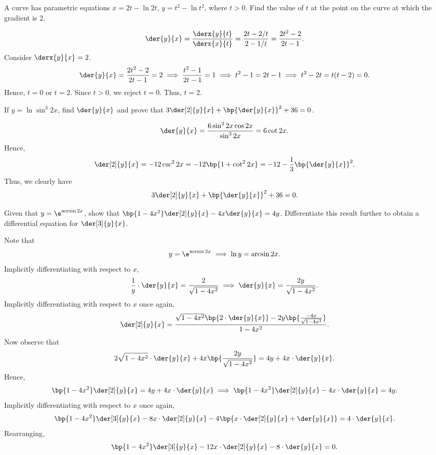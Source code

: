 \begin{problem}
    A curve has parametric equations $x = 2t-\ln{2t}, \, y = t^2 - \ln t^2$, where $t > 0$. Find the value of $t$ at the point on the curve at which the gradient is 2.
\end{problem}
\begin{solution}
    \[\der{y}{x} = \frac{\derx{y}{t}}{\derx{x}{t}} = \frac{2t - 2/t}{2 - 1/t} = \frac{2t^2 - 2}{2t - 1}.\] Consider $\derx{y}{x} = 2$. \[\der{y}{x} = \frac{2t^2 - 2}{2t - 1} = 2 \implies \frac{t^2 - 1}{2t - 1} = 1 \implies t^2 - 1 = 2t - 1 \implies t^2 - 2t = t(t - 2) = 0.\] Hence, $t = 0$ or $t = 2$. Since $t > 0$, we reject $t = 0$. Thus, $t = 2$.
\end{solution}

\clearpage
\begin{problem}
    If $y = \ln{\sin^3 2x}$, find $\der{y}{x}$ and prove that $3\der[2]{y}{x} + \bp{\der{y}{x}}^2 + 36 = 0$.
\end{problem}
\begin{solution}
    \[\der{y}{x} = \frac{6\sin^2 2x \cos 2x}{\sin^3 2x} = 6\cot 2x.\] Hence, \[\der[2]{y}{x} = -12\csc^2 2x = -12 \bp{1 + \cot^2 2x} = -12 - \frac13 \bp{\der{y}{x}}^2.\] Thus, we clearly have \[3\der[2]{y}{x} + \bp{\der{y}{x}}^2 + 36 = 0.\]
\end{solution}

\begin{problem}
    Given that $y = \e^{\arcsin{2x}}$, show that $\bp{1-4x^2}\der[2]{y}{x} - 4x\der{y}{x} = 4y$. Differentiate this result further to obtain a differential equation for $\der[3]{y}{x}$.
\end{problem}
\begin{solution}
    Note that \[y = \e^{\arcsin{2x}} \implies \ln y = \arcsin{2x}.\] Implicitly differentiating with respect to $x$, \[\frac1y \cdot \der{y}{x} = \frac2{\sqrt{1 - 4x^2}} \implies \der{y}{x} = \frac{2y}{\sqrt{1 - 4x^2}}.\] Implicitly differentiating with respect to $x$ once again, \[\der[2]{y}{x} = \frac{\sqrt{1 - 4x^2} \bp{2 \cdot \der{y}{x}} - 2y \bp{\frac{-4x}{\sqrt{1 - 4x^2}}}}{1 - 4x^2}.\] Now observe that \[2\sqrt{1 - 4x^2} \cdot \der{y}{x} + 4x \bp{\frac{2y}{\sqrt{1 - 4x^2}}} = 4y + 4x \cdot \der{y}{x}.\] Hence, \[\bp{1 - 4x^2}\der[2]{y}{x} = 4y + 4x\cdot\der{y}{x} \implies \bp{1-4x^2}\der[2]{y}{x} - 4x \cdot \der{y}{x} = 4y.\] Implicitly differentiating with respect to $x$ once again, \[\bp{1 - 4x^2} \der[3]{y}{x} -8x \cdot \der[2]{y}{x} -4 \bp{x \cdot \der[2]{y}{x} + \der{y}{x}} = 4\cdot \der{y}{x}.\] Rearranging, \[\bp{1 - 4x^2} \der[3]{y}{x} -12x \cdot \der[2]{y}{x} - 8 \cdot\der{y}{x} = 0.\]
\end{solution}
